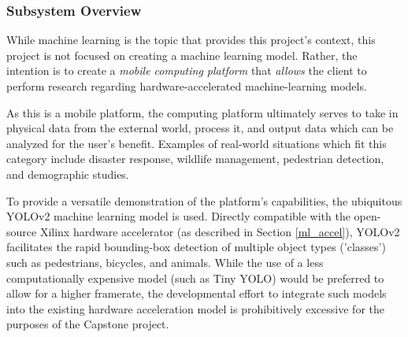 
% 

\subsubsection{Subsystem Overview}
While machine learning is the topic that provides this project's context, this project is not focused on creating a machine learning model. Rather, the intention is to create a \textit{mobile computing platform} that \textit{allows} the client to perform research regarding hardware-accelerated machine-learning models.

As this is a mobile platform, the computing platform ultimately serves to take in physical data from the external world, process it, and output data which can be analyzed for the user's benefit. Examples of real-world situations which fit this category include disaster response, wildlife management, pedestrian detection, and demographic studies.

To provide a versatile demonstration of the platform's capabilities, the ubiquitous YOLOv2 machine learning model is used. Directly compatible with the open-source Xilinx hardware accelerator (as described in Section \ref{ml_accel}), YOLOv2 facilitates the rapid bounding-box detection of multiple object types ('classes') such as pedestrians, bicycles, and animals. While the use of a less computationally expensive model (such as Tiny YOLO) would be preferred to allow for a higher framerate, the developmental effort to integrate such models into the existing hardware acceleration model is prohibitively excessive for the purposes of the Capstone project.

